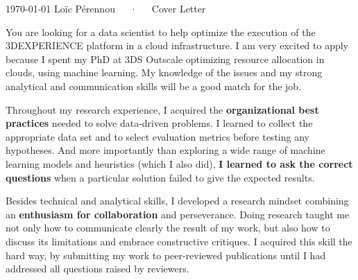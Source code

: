 \documentclass[11pt, a4paper]{awesome-cv}
\begin{document}
\makecvheader[R]

\makecvfooter
  {\today}
  {Loïc Pérennou~~~·~~~Cover Letter}
  {}

\makelettertitle

\begin{cvletter}
  You are looking for a data scientist to help optimize the execution of the 3DEXPERIENCE platform in a cloud infrastructure.  
  I am very excited to apply because I spent my PhD at 3DS Outscale optimizing resource allocation in clouds, using machine learning. My knowledge of the issues and my strong analytical and communication skills will be a good match for the job. 

Throughout my research experience, I acquired the \textbf{organizational best practices} needed to solve data-driven problems.  
I learned to collect the appropriate data set and to select evaluation metrics before testing any hypotheses. 
And more importantly than exploring a wide range of machine learning models and heuristics (which I also did), \textbf{I learned to ask the correct questions} when a particular solution failed to give the expected results.  

Besides technical and analytical skills, I developed a research mindset combining an \textbf{enthusiasm for collaboration} and perseverance.  
Doing research taught me not only how to communicate clearly the result of my work, but also how to discuss its limitations and embrace constructive critiques.  
I acquired this skill the hard way, by submitting my work to peer-reviewed publications until I had addressed all questions raised by reviewers. 


\end{cvletter}
\end{document}
